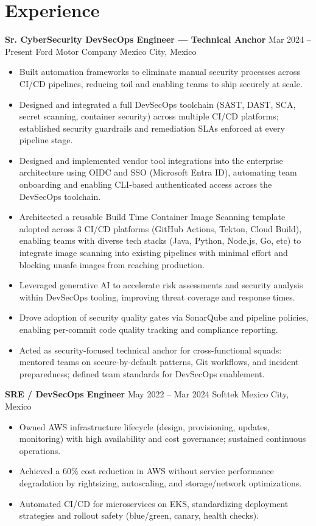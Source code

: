 \documentclass[11pt,a4paper]{article}
\newcommand{\role}[2]{\textbf{#1} \hfill {\small #2}}%
\newcommand{\org}[2]{{#1} \hfill {\small #2}}%
\begin{document}
\section*{Experience}
\role{Sr. CyberSecurity DevSecOps Engineer — Technical Anchor}{Mar 2024 -- Present}
\org{Ford Motor Company}{Mexico City, Mexico}
\begin{itemize}
  \item Built automation frameworks to eliminate manual security processes across CI/CD pipelines, reducing toil and enabling teams to ship securely at scale.
  \item Designed and integrated a full DevSecOps toolchain (SAST, DAST, SCA, secret scanning, container security) across multiple CI/CD platforms; established security guardrails and remediation SLAs enforced at every pipeline stage.
  \item Designed and implemented vendor tool integrations into the enterprise architecture using OIDC and SSO (Microsoft Entra ID), automating team onboarding and enabling CLI-based authenticated access across the DevSecOps toolchain.
  \item Architected a reusable Build Time Container Image Scanning template adopted across 3 CI/CD platforms (GitHub Actions, Tekton, Cloud Build), enabling teams with diverse tech stacks (Java, Python, Node.js, Go, etc) to integrate image scanning into existing pipelines with minimal effort and blocking unsafe images from reaching production.
  \item Leveraged generative AI to accelerate risk assessments and security analysis within DevSecOps tooling, improving threat coverage and response times.
  \item Drove adoption of security quality gates via SonarQube and pipeline policies, enabling per-commit code quality tracking and compliance reporting.
  \item Acted as security-focused technical anchor for cross-functional squads: mentored teams on secure-by-default patterns, Git workflows, and incident preparedness; defined team standards for DevSecOps enablement.
\end{itemize}

\role{SRE / DevSecOps Engineer}{May 2022 -- Mar 2024}
\org{Softtek}{Mexico City, Mexico}
\begin{itemize}
  \item Owned AWS infrastructure lifecycle (design, provisioning, updates, monitoring) with high availability and cost governance; sustained continuous operations.
  \item Achieved a 60\% cost reduction in AWS without service performance degradation by rightsizing, autoscaling, and storage/network optimizations.
  \item Automated CI/CD for microservices on EKS, standardizing deployment strategies and rollout safety (blue/green, canary, health checks).
\end{itemize}
\end{document}
